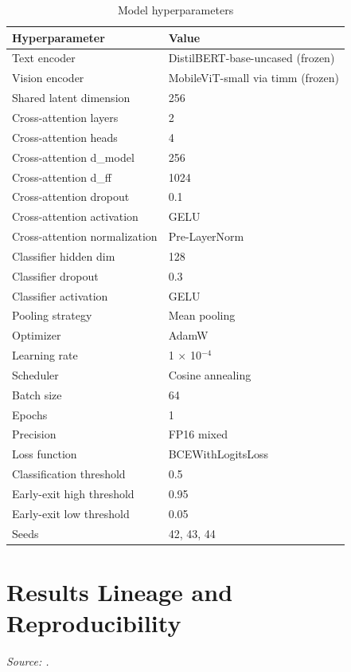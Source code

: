 \documentclass[10pt,twoside]{article}
\begin{document}
\begin{table}[H]
\centering
\caption{Model hyperparameters}
\label{tab:apphyper}
\small
\begin{tabular}{ll}\toprule
Hyperparameter & Value \\
\midrule
Text encoder & DistilBERT-base-uncased (frozen) \\
Vision encoder & MobileViT-small via timm (frozen) \\
Shared latent dimension & 256 \\
Cross-attention layers & 2 \\
Cross-attention heads & 4 \\
Cross-attention d\_model & 256 \\
Cross-attention d\_ff & 1024 \\
Cross-attention dropout & 0.1 \\
Cross-attention activation & GELU \\
Cross-attention normalization & Pre-LayerNorm \\
Classifier hidden dim & 128 \\
Classifier dropout & 0.3 \\
Classifier activation & GELU \\
Pooling strategy & Mean pooling \\
Optimizer & AdamW \\
Learning rate & 1 $\times$ 10$^{-4}$ \\
Scheduler & Cosine annealing \\
Batch size & 64 \\
Epochs & 1 \\
Precision & FP16 mixed \\
Loss function & BCEWithLogitsLoss \\
Classification threshold & 0.5 \\
Early-exit high threshold & 0.95 \\
Early-exit low threshold & 0.05 \\
Seeds & 42, 43, 44 \\
\bottomrule
\end{tabular}

\end{table}

\section{Results Lineage and Reproducibility}\label{app:C}

\emph{Source: .}
\end{document}
